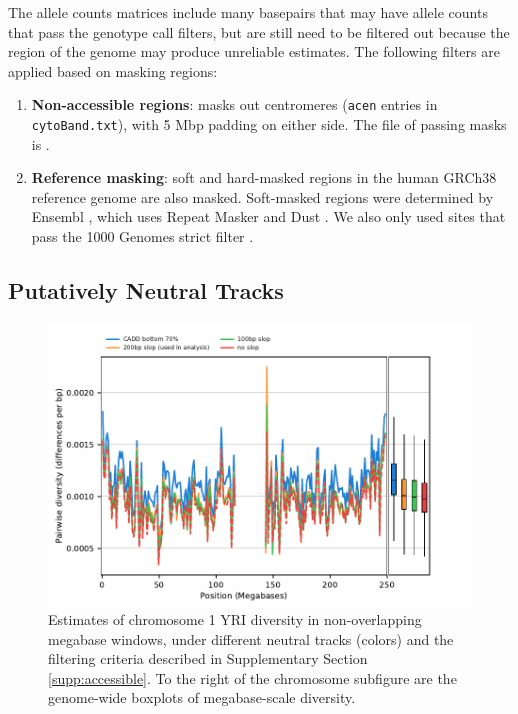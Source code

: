 \documentclass[11pt]{article}
\begin{document}
The allele counts matrices include many basepairs that may have allele counts
that pass the genotype call filters, but are still need to be filtered out
because the region of the genome may produce unreliable estimates. The
following filters are applied based on masking regions:

\begin{enumerate}

  \item \textbf{Non-accessible regions}: masks out centromeres (\texttt{acen} entries in
    \texttt{cytoBand.txt}), with 5 Mbp padding on either side. The file of
    passing masks is . 

  \item \textbf{Reference masking}: soft and hard-masked regions in the human
      GRCh38 reference genome are also masked. Soft-masked regions were
      determined by Ensembl \parencite{Cunningham2022-vk}, which uses Repeat
      Masker \parencite{Smit2015-nm} and Dust \parencite{Morgulis2006-uo}. We
      also only used sites that pass the 1000 Genomes strict filter
      \parencite{1000_Genomes_Project_Consortium2015-mi}.

\end{enumerate}

\subsection{Putatively Neutral Tracks}
\label{supp:neutral}

\begin{figure}[!htb]
  \centering
  \includegraphics[width=\textwidth]{figures/supplementary/neutral_tracks.pdf}

  \caption{Estimates of chromosome 1 YRI diversity in non-overlapping megabase
      windows, under different neutral tracks (colors) and the filtering
      criteria described in Supplementary Section \ref{supp:accessible}. To the
      right of the chromosome subfigure are the genome-wide boxplots of
      megabase-scale diversity. } 

  \label{suppfig:neutral-tracks}
\end{figure}
\end{document}
